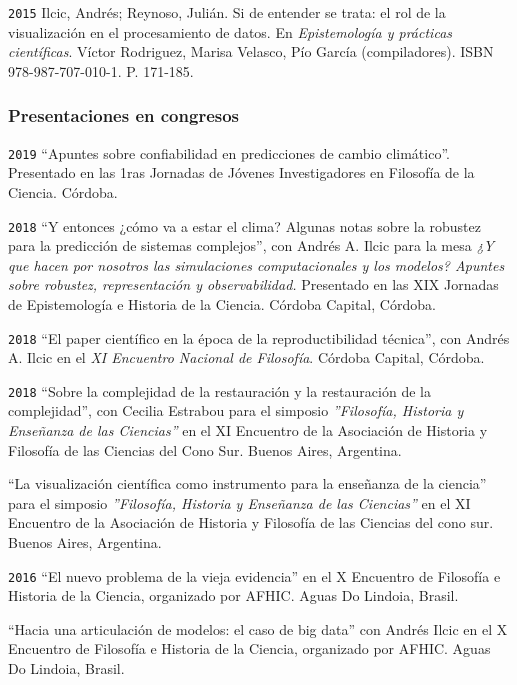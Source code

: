 \documentclass[]{article}
\begin{document}
\texttt{2015} Ilcic, Andrés; Reynoso, Julián. Si de entender se trata:
el rol de la visualización en el procesamiento de datos. En
\emph{Epistemología y prácticas científicas}. Víctor Rodriguez, Marisa
Velasco, Pío García (compiladores). ISBN 978-987-707-010-1. P. 171-185.

\hypertarget{presentaciones-en-congresos}{%
\subsubsection{Presentaciones en
congresos}\label{presentaciones-en-congresos}}

\texttt{2019} ``Apuntes sobre confiabilidad en predicciones de cambio
climático''. Presentado en las 1ras Jornadas de Jóvenes Investigadores
en Filosofía de la Ciencia. Córdoba.

\texttt{2018} ``Y entonces ¿cómo va a estar el clima? Algunas notas
sobre la robustez para la predicción de sistemas complejos'', con Andrés
A. Ilcic para la mesa \emph{¿Y que hacen por nosotros las simulaciones
computacionales y los modelos? Apuntes sobre robustez, representación y
observabilidad.} Presentado en las XIX Jornadas de Epistemología e
Historia de la Ciencia. Córdoba Capital, Córdoba.

\texttt{2018} ``El paper científico en la época de la reproductibilidad
técnica'', con Andrés A. Ilcic en el \emph{XI Encuentro Nacional de
Filosofía}. Córdoba Capital, Córdoba.

\texttt{2018} ``Sobre la complejidad de la restauración y la
restauración de la complejidad'', con Cecilia Estrabou para el simposio
\emph{''Filosofía, Historia y Enseñanza de las Ciencias''} en el XI
Encuentro de la Asociación de Historia y Filosofía de las Ciencias del
Cono Sur. Buenos Aires, Argentina.

``La visualización científica como instrumento para la enseñanza de la
ciencia'' para el simposio \emph{''Filosofía, Historia y Enseñanza de
las Ciencias''} en el XI Encuentro de la Asociación de Historia y
Filosofía de las Ciencias del cono sur. Buenos Aires, Argentina.

\texttt{2016} ``El nuevo problema de la vieja evidencia'' en el X
Encuentro de Filosofía e Historia de la Ciencia, organizado por AFHIC.
Aguas Do Lindoia, Brasil.

``Hacia una articulación de modelos: el caso de big data'' con Andrés
Ilcic en el X Encuentro de Filosofía e Historia de la Ciencia,
organizado por AFHIC. Aguas Do Lindoia, Brasil.
\end{document}
